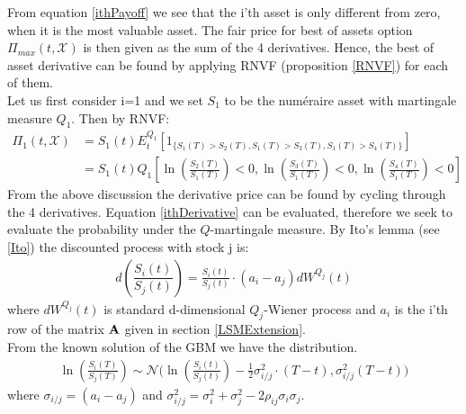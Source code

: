 From equation \eqref{ithPayoff} we see that the i'th asset is only different from zero, when it is the most valuable asset. The fair price for best of assets option $\Pi_{max}(t,\mathcal{X})$ is then given as the sum of the 4 derivatives. Hence, the best of asset derivative can be found by applying RNVF (proposition \ref{RNVF}) for each of them.\\

Let us first consider i=1 and we set $S_1$ to be the numéraire asset with martingale measure $Q_1$. Then by RNVF:
\begin{equation}\label{ithDerivative}
\begin{split}
\Pi_1(t, \mathcal{X})&=S_1(t)E_t^{Q_1}[1_{\{S_1(T)>S_2(T), S_1(T)>S_3(T), S_1(T)>S_4(T)\}}]\\
&=S_1(t) Q_1[\ln(\frac{S_2(T)}{S_1(T)})<0, \ln(\frac{S_3(T)}{S_1(T)})<0, \ln(\frac{S_4(T)}{S_1(T)})<0]
\end{split}
\end{equation}
From the above discussion the derivative price can be found by cycling through the 4 derivatives. Equation \eqref{ithDerivative} can be evaluated, therefore we seek to evaluate the probability under the $Q$-martingale measure. By Ito's lemma (see \ref{Ito}) the discounted process with stock j is:
\begin{align*}
d(\dfrac{S_i(t)}{S_j(t)})=\frac{S_i(t)}{S_j(t)} \cdot (a_i-a_j)dW^{Q_j}(t) 
\end{align*}
where $dW^{Q_j}(t)$ is standard d-dimensional $Q_j$-Wiener process and $a_i$ is the i'th row of the matrix $\mathbf{A}$ given in section \ref{LSMExtension}. \\

From the known solution of the GBM we have the distribution.
\begin{align*}
\ln(\frac{S_i(T)}{S_j(T)})\sim \mathcal{N}\bigg(\ln(\frac{S_i(t)}{S_j(t)}) - \frac{1}{2}\sigma_{i/j}^2 \cdot (T-t), \sigma_{i/j}^2 (T-t)\bigg)
\end{align*}
where $\sigma_{i/j}=(a_i-a_j)$ and $\sigma_{i/j}^2=\sigma_i^2+\sigma_j^2-2\rho_{ij}\sigma_i \sigma_j$.\\

